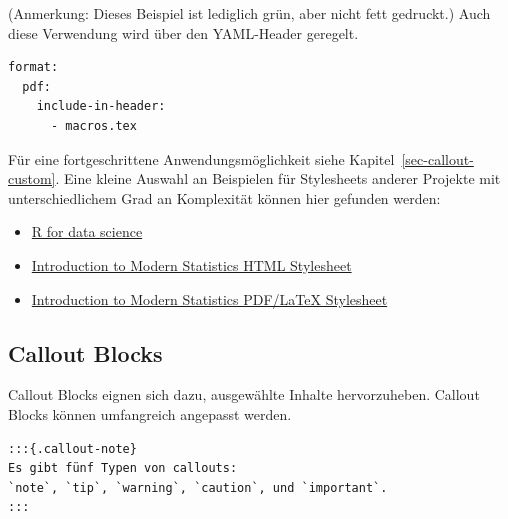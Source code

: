 \documentclass[
  letterpaper,
  DIV=11]{scrartcl}
\begin{document}
(Anmerkung: Dieses Beispiel ist lediglich grün, aber nicht fett
gedruckt.) Auch diese Verwendung wird über den YAML-Header geregelt.

\begin{verbatim}
format:
  pdf: 
    include-in-header:
      - macros.tex
\end{verbatim}

Für eine fortgeschrittene Anwendungsmöglichkeit siehe
Kapitel~\ref{sec-callout-custom}. Eine kleine Auswahl an Beispielen für
Stylesheets anderer Projekte mit unterschiedlichem Grad an Komplexität
können hier gefunden werden:

\begin{itemize}
\item
  \href{https://github.com/hadley/r4ds/blob/main/r4ds.scss}{R for data
  science}
\item
  \href{https://github.com/OpenIntroStat/ims/blob/main/scss/ims-style.scss}{Introduction
  to Modern Statistics HTML Stylesheet}
\item
  \href{https://github.com/OpenIntroStat/ims/blob/main/latex/ims-style.tex}{Introduction
  to Modern Statistics PDF/LaTeX Stylesheet}
\end{itemize}

\subsection{Callout Blocks}\label{callout-blocks}

Callout Blocks eignen sich dazu, ausgewählte Inhalte hervorzuheben.
Callout Blocks können umfangreich angepasst werden.

\begin{verbatim}
:::{.callout-note}
Es gibt fünf Typen von callouts: 
`note`, `tip`, `warning`, `caution`, und `important`.
:::
\end{verbatim}
\end{document}
